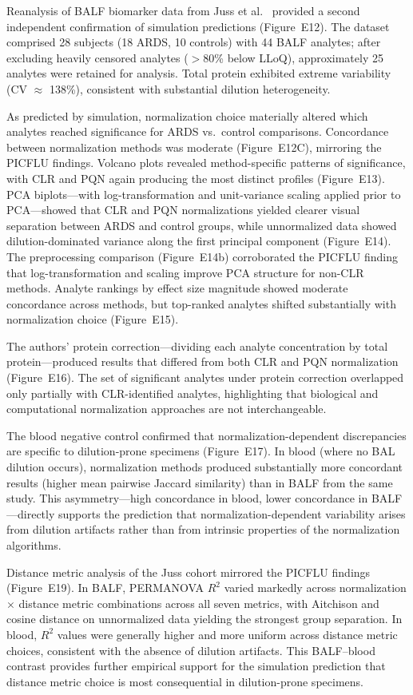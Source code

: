 \documentclass[12pt]{article}
\begin{document}
Reanalysis of BALF biomarker data from Juss et al.~\cite{Juss2016} provided a second independent confirmation of simulation predictions (Figure~E12). The dataset comprised 28 subjects (18 ARDS, 10 controls) with 44 BALF analytes; after excluding heavily censored analytes ($>$80\% below LLoQ), approximately 25 analytes were retained for analysis. Total protein exhibited extreme variability (CV $\approx$ 138\%), consistent with substantial dilution heterogeneity.

As predicted by simulation, normalization choice materially altered which analytes reached significance for ARDS vs.\ control comparisons. Concordance between normalization methods was moderate (Figure~E12C), mirroring the PICFLU findings. Volcano plots revealed method-specific patterns of significance, with CLR and PQN again producing the most distinct profiles (Figure~E13). PCA biplots---with log-transformation and unit-variance scaling applied prior to PCA---showed that CLR and PQN normalizations yielded clearer visual separation between ARDS and control groups, while unnormalized data showed dilution-dominated variance along the first principal component (Figure~E14). The preprocessing comparison (Figure~E14b) corroborated the PICFLU finding that log-transformation and scaling improve PCA structure for non-CLR methods. Analyte rankings by effect size magnitude showed moderate concordance across methods, but top-ranked analytes shifted substantially with normalization choice (Figure~E15).

The authors' protein correction---dividing each analyte concentration by total protein---produced results that differed from both CLR and PQN normalization (Figure~E16). The set of significant analytes under protein correction overlapped only partially with CLR-identified analytes, highlighting that biological and computational normalization approaches are not interchangeable.

The blood negative control confirmed that normalization-dependent discrepancies are specific to dilution-prone specimens (Figure~E17). In blood (where no BAL dilution occurs), normalization methods produced substantially more concordant results (higher mean pairwise Jaccard similarity) than in BALF from the same study. This asymmetry---high concordance in blood, lower concordance in BALF---directly supports the prediction that normalization-dependent variability arises from dilution artifacts rather than from intrinsic properties of the normalization algorithms.

Distance metric analysis of the Juss cohort mirrored the PICFLU findings (Figure~E19). In BALF, PERMANOVA $R^2$ varied markedly across normalization $\times$ distance metric combinations across all seven metrics, with Aitchison and cosine distance on unnormalized data yielding the strongest group separation. In blood, $R^2$ values were generally higher and more uniform across distance metric choices, consistent with the absence of dilution artifacts. This BALF--blood contrast provides further empirical support for the simulation prediction that distance metric choice is most consequential in dilution-prone specimens.
\end{document}
